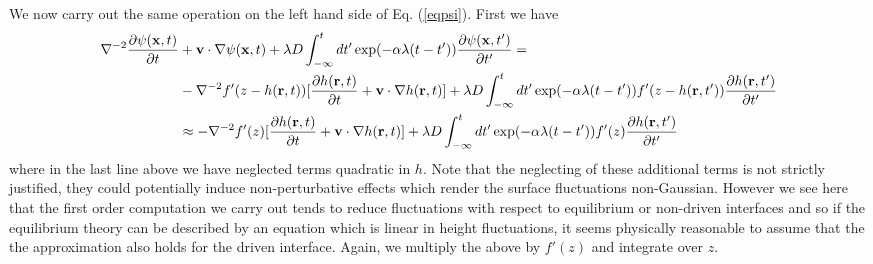We now carry out the same operation on the left hand side of Eq. (\ref{eqpsi}). First we have
\begin{align}
\nabla^{-2}\frac{\partial \psi({\bf x},t)}{\partial t}&+{\bf v}\cdot\nabla \psi({\bf x},t) +\lambda D\int_{-\infty}^t dt'
\exp(-\alpha\lambda(t-t')) \frac{\partial \psi({\bf x},t')}{\partial t'} = \nonumber \\
&-\nabla^{-2}f'(z-h({\bf r},t))[\frac{\partial h({\bf r},t)}{\partial t} +{\bf v}\cdot\nabla h({\bf r},t)]  +\lambda D\int_{-\infty}^t dt'
\exp(-\alpha\lambda(t-t')) f'(z-h({\bf r},t'))\frac{\partial h({\bf r},t')}{\partial t'}\nonumber \\
&\approx -\nabla^{-2}f'(z) [\frac{\partial h({\bf r},t)}{\partial t} +{\bf v}\cdot\nabla h({\bf r},t)] +\lambda D\int_{-\infty}^t dt'
\exp(-\alpha\lambda(t-t')) f'(z)\frac{\partial h({\bf r},t')}{\partial t'}
\end{align}
where in the last line above we have neglected terms quadratic in $h$. 
Note that the neglecting of these additional terms is not strictly justified, they could potentially induce non-perturbative effects which render the surface fluctuations non-Gaussian. However we see here that the first order computation we carry out tends to reduce fluctuations with respect to equilibrium or non-driven interfaces and so if the equilibrium theory can be described by an equation which is linear in height fluctuations, it seems physically reasonable to assume that the the approximation also holds for the driven interface. 
Again, we multiply the above by $f'(z)$ and integrate over $z$. 

